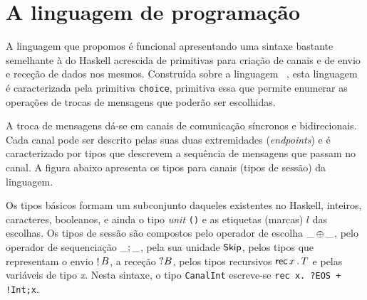 \section{A linguagem de programação \mixedchoice}


A linguagem que propomos é funcional apresentando uma sintaxe bastante
semelhante à do Haskell acrescida de primitivas para criação de canais
e de envio e receção de dados nos mesmos.  Construída sobre a
linguagem \freest~\cite{2019freest}, esta linguagem é caracterizada
pela primitiva \lstinline|choice|, primitiva essa que permite enumerar
as operações de trocas de mensagens que poderão ser escolhidas.

A troca de mensagens dá-se em canais de comunicação síncronos e
bidirecionais. Cada canal pode ser descrito pelas suas duas
extremidades (\textit{endpoints}) e é caracterizado por tipos que
descrevem a sequência de mensagens que passam no canal. %
A figura abaixo apresenta os tipos para canais (tipos de sessão) da
linguagem.
%


Os tipos básicos formam um subconjunto daqueles existentes no Haskell,
inteiros, caracteres, booleanos, e ainda o tipo \textit{unit}
\lstinline|()| e as etiquetas (marcas) $l$ das escolhas.  Os tipos de
sessão são compostos pelo operador de escolha $\_ \oplus \_$, pelo
operador de sequenciação $\_;\_$, pela sua unidade $\mathsf{Skip}$,
pelos tipos que representam o envio $\mathop! B$, a receção $?B$,
pelos tipos recursivos $\mathsf{rec}\,x\,.\,T$ e pelas variáveis de tipo
\textit{x}. Nesta sintaxe, o tipo \lstinline|CanalInt| escreve-se
%
\lstinline|rec x. ?EOS + !Int;x|.

